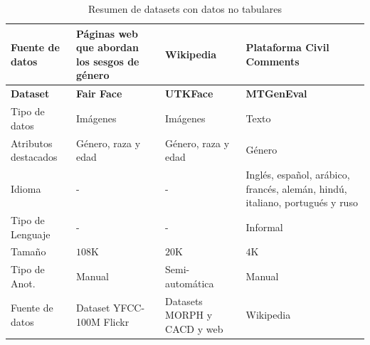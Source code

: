 \begin{table}[htpb]
{\begin{tabular}{lp{}p{}p{}}
                \midrule
                Fuente de datos      & P\'aginas web que abordan los sesgos de g\'enero & Wikipedia                                           & Plataforma Civil Comments       \\
                \toprule
                \toprule
                \textbf{Dataset}     & \textbf{Fair Face}                               & \textbf{UTKFace}                                    & \textbf{MTGenEval}              \\
                \toprule
                \toprule
                Tipo de datos        & Im\'agenes                                       & Im\'agenes                                          & Texto                           \\
                \midrule
                Atributos destacados & G\'enero, raza y edad                            & G\'enero, raza y edad                               & G\'enero                        \\
                \midrule
                Idioma               & -                                                & -                                                   & Ingl\'es, espa\~nol, ar\'abico, franc\'es, alem\'an, hind\'u, italiano, portugu\'es y ruso\\
                \midrule
                Tipo de Lenguaje     & -                                                & -                                                   & Informal                        \\
                \midrule
                Tama\~no             & $108$K                                           & $20$K                                               & $4$K                              \\
                \midrule
                Tipo de Anot.        & Manual                                           & Semi-autom\'atica                                   & Manual                          \\
                \midrule
                Fuente de datos      &  Dataset YFCC-100M Flickr                        & Datasets MORPH y CACD y web                         & Wikipedia                       \\
                \bottomrule
                \bottomrule
            \end{tabular}}
        \caption{Resumen de datasets con datos no tabulares}
        \label{table:datasets}
    \end{table}
    
